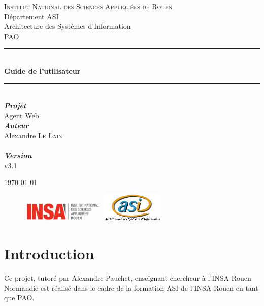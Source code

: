 \documentclass[11pt,dvipsnames,svgnames]{report}
\begin{document}
\begin{titlepage}
\newcommand{\HRule}{\rule{\linewidth}{0.5mm}} 
\center 
{}\textsc{\huge Institut National des Sciences Appliquées de Rouen}\\[0.7cm] 
\LARGE Département ASI~\\[0.5cm]
\Large{Architecture des Systèmes d'Information} ~\\[1.5cm]
\textsc{\Large PAO}\\[0.5cm] 

\HRule \\[0.4cm]
{ \huge \bfseries Guide de l'utilisateur}\\[0.18cm] \HRule \\[1.5cm]
 
\LARGE \emph{\textbf{Projet}} \\
{Agent Web}\\[1.3cm]

\large
	\emph{\textbf{Auteur}}\\
	Alexandre \textsc{Le Lain}\\[0.3cm]
	
~\\[0.5cm]
\Large \emph{\textbf{Version}}\\
	\textsc{v3.1}

\vfill{\today} 

\begin{figure}
\includegraphics[width=4cm]{images/LogoINSA.png}\hfill
\includegraphics[width=3cm]{images/logoasi.png}
\end{figure}


 \end{titlepage}

\newpage
\tableofcontents

\newpage


\chapter*{Introduction}
	Ce projet, tutoré par Alexandre Pauchet, enseignant chercheur à l'INSA Rouen Normandie est réalisé dans le cadre de la formation ASI de l'INSA Rouen en tant que PAO.\\ 
	
\end{document}
